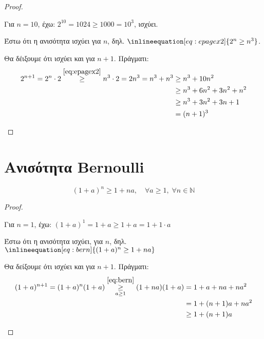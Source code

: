 \documentclass[main.tex]{subfiles}
\begin{document}
\begin{proof}
\item {}
    \begin{myitemize}
        \item Για $ n=10 $, έχω: $ 2^{10} = 1024 \geq 1000 = 10^{3}  $, 
            ισχύει.
        \item Έστω ότι η ανισότητα ισχύει για $n$, δηλ. 
            $\inlineequation[eq:epagex2]{2^{n} \geq n^{3}}$.
        \item Θα δέιξουμε ότι ισχύει και για $ n+1 $. Πράγματι:
            \begin{align*}
                2^{n+1} = 2^{n} \cdot 2 \overset{\eqref{eq:epagex2}}{\geq} n^{3} 
                \cdot 2 = 2n^{3} = n^{3} + n^{3} &\geq n^{3} + 10n^{2} \\
                                                 &\geq n^{3} + 6n^{2} + 3n^{2} 
                                                 + n^{2} \\ 
                                                 &\geq n^{3} + 3n^{2} + 3n + 1 \\ 
                                                 &= (n+1)^{3}
            \end{align*} 
    \end{myitemize}
\end{proof}

\section{Ανισότητα Bernoulli}
\[
    \boxed{(1+a)^{n} \geq 1 + na, \quad \forall a \geq 1, \; \forall n \in
    \mathbb{N}}
\] 


\begin{proof}
\item {}
    \begin{myitemize}
        \item Για $ n=1 $, έχω: $ (1+a)^{1} = 1+a \geq 1+a = 1 + 1 \cdot a $
        \item Έστω ότι η ανισότητα ισχύει, για $ n $, δηλ. $\inlineequation[eq:bern]
            {(1+a)^{n} \geq 1 + na}$
        \item Θα δείξουμε ότι ισχύει και για $ n+1 $. Πράγματι:
            \begin{align*}
                (1+a)^{n+1} = (1+a)^{n}(1+a) \overset{\eqref{eq:bern}}
                {\underset{a \geq 1}{\geq}}
                (1+na)(1+a) &= 1 + a + na + na^{2} \\
                            &= 1 + (n+1)a + na^{2} \\
                            &\geq 1 + (n+1)a
            \end{align*}

    \end{myitemize}
\end{proof}
\end{document}
